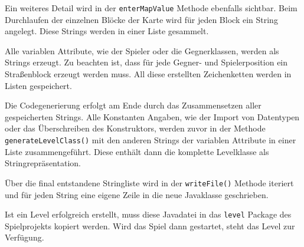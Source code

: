 Ein weiteres Detail wird in der \texttt{enterMapValue} Methode ebenfalls sichtbar.
Beim Durchlaufen der einzelnen Blöcke der Karte wird für jeden Block ein String angelegt.
Diese Strings werden in einer Liste gesammelt.

Alle variablen Attribute, wie der Spieler oder die Gegnerklassen, werden als Strings erzeugt.
Zu beachten ist, dass für jede Gegner- und Spielerposition ein Straßenblock erzeugt werden muss. All diese erstellten Zeichenketten werden in Listen gespeichert. 

Die Codegenerierung erfolgt am Ende durch das Zusammensetzen aller gespeicherten Strings. Alle Konstanten Angaben, wie der Import von Datentypen oder das Überschreiben des Konstruktors, werden zuvor in der Methode \texttt{generateLevelClass()} mit den anderen Strings der variablen Attribute in einer Liste zusammengeführt.
Diese enthält dann die komplette Levelklasse als Stringrepräsentation.
 
Über die final entstandene Stringliste wird in der \texttt{writeFile()} Methode iteriert und für jeden String eine eigene Zeile in die neue Javaklasse geschrieben.

Ist ein Level erfolgreich erstellt, muss diese Javadatei in das \texttt{level} Package des Spielprojekts kopiert werden.
Wird das Spiel dann gestartet, steht das Level zur Verfügung.